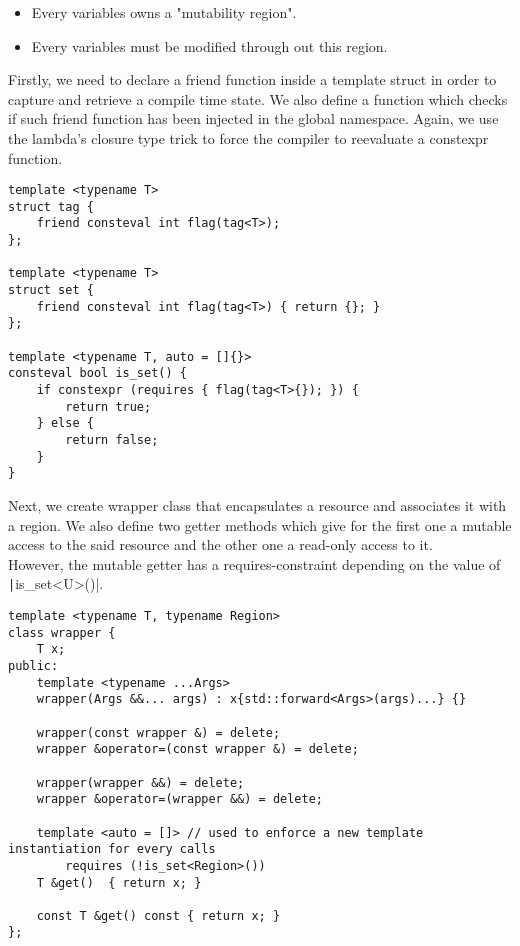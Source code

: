 	\begin{itemize}
		\item Every variables owns a "mutability region".
		\item Every variables must be modified through out this region.
	\end{itemize}

    \hrulefill

	Firstly, we need to declare a friend function inside a template struct in order to capture and retrieve a compile time state. We also define a function which checks if such friend function has been injected in the global namespace. Again, we use the lambda's closure type trick to force the compiler to reevaluate a constexpr function.

	\begin{verbatim}
template <typename T>
struct tag {
    friend consteval int flag(tag<T>);
};

template <typename T>
struct set {
    friend consteval int flag(tag<T>) { return {}; }
};

template <typename T, auto = []{}>
consteval bool is_set() {
    if constexpr (requires { flag(tag<T>{}); }) {
        return true;
    } else {
        return false;
    }
}
	\end{verbatim}

	Next, we create wrapper class that encapsulates a resource and associates it with a region. We also define two getter methods which give for the first one a mutable access to the said resource and the other one a read-only access to it.
	\\

	However, the mutable getter has a requires-constraint depending on the value of \texttt|is_set<U>()|.

	\begin{verbatim}
template <typename T, typename Region>
class wrapper {
    T x;
public:
    template <typename ...Args>
    wrapper(Args &&... args) : x{std::forward<Args>(args)...} {}

    wrapper(const wrapper &) = delete;
    wrapper &operator=(const wrapper &) = delete;

    wrapper(wrapper &&) = delete;
    wrapper &operator=(wrapper &&) = delete;

    template <auto = []> // used to enforce a new template instantiation for every calls
        requires (!is_set<Region>())
    T &get()  { return x; }

    const T &get() const { return x; }
};
\end{verbatim}

